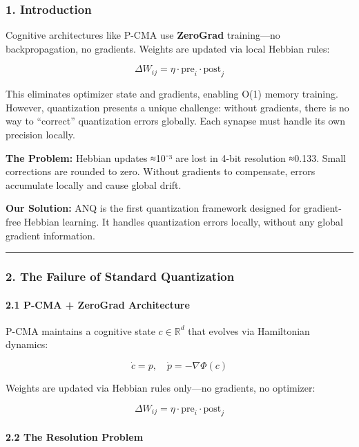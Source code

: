 \documentclass[
  11pt,
  a4paper,
]{article}
\begin{document}
\subsubsection{1. Introduction}\label{introduction}

Cognitive architectures like P-CMA use \textbf{ZeroGrad} training---no
backpropagation, no gradients. Weights are updated via local Hebbian
rules:

\[
\Delta W_{ij} = \eta \cdot \text{pre}_i \cdot \text{post}_j
\]

This eliminates optimizer state and gradients, enabling O(1) memory
training. However, quantization presents a unique challenge: without
gradients, there is no way to ``correct'' quantization errors globally.
Each synapse must handle its own precision locally.

\textbf{The Problem:} Hebbian updates ≈10⁻³ are lost in 4-bit resolution
≈0.133. Small corrections are rounded to zero. Without gradients to
compensate, errors accumulate locally and cause global drift.

\textbf{Our Solution:} ANQ is the first quantization framework designed
for gradient-free Hebbian learning. It handles quantization errors
locally, without any global gradient information.

\begin{center}\rule{0.5\linewidth}{0.5pt}\end{center}

\subsubsection{2. The Failure of Standard
Quantization}\label{the-failure-of-standard-quantization}

\paragraph{2.1 P-CMA + ZeroGrad
Architecture}\label{p-cma-zerograd-architecture}

P-CMA maintains a cognitive state \(c \in \mathbb{R}^d\) that evolves
via Hamiltonian dynamics:

\[
\dot{c} = p, \quad \dot{p} = -\nabla\Phi(c)
\]

Weights are updated via Hebbian rules only---no gradients, no optimizer:

\[
\Delta W_{ij} = \eta \cdot \text{pre}_i \cdot \text{post}_j
\]

\paragraph{2.2 The Resolution Problem}\label{the-resolution-problem}
\end{document}
